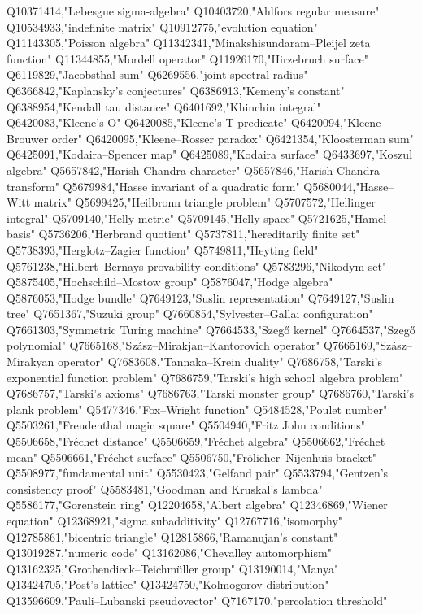 Q10371414,"Lebesgue sigma-algebra"
Q10403720,"Ahlfors regular measure"
Q10534933,"indefinite matrix"
Q10912775,"evolution equation"
Q11143305,"Poisson algebra"
Q11342341,"Minakshisundaram–Pleijel zeta function"
Q11344855,"Mordell operator"
Q11926170,"Hirzebruch surface"
Q6119829,"Jacobsthal sum"
Q6269556,"joint spectral radius"
Q6366842,"Kaplansky's conjectures"
Q6386913,"Kemeny's constant"
Q6388954,"Kendall tau distance"
Q6401692,"Khinchin integral"
Q6420083,"Kleene's O"
Q6420085,"Kleene's T predicate"
Q6420094,"Kleene–Brouwer order"
Q6420095,"Kleene–Rosser paradox"
Q6421354,"Kloosterman sum"
Q6425091,"Kodaira–Spencer map"
Q6425089,"Kodaira surface"
Q6433697,"Koszul algebra"
Q5657842,"Harish-Chandra character"
Q5657846,"Harish-Chandra transform"
Q5679984,"Hasse invariant of a quadratic form"
Q5680044,"Hasse–Witt matrix"
Q5699425,"Heilbronn triangle problem"
Q5707572,"Hellinger integral"
Q5709140,"Helly metric"
Q5709145,"Helly space"
Q5721625,"Hamel basis"
Q5736206,"Herbrand quotient"
Q5737811,"hereditarily finite set"
Q5738393,"Herglotz–Zagier function"
Q5749811,"Heyting field"
Q5761238,"Hilbert–Bernays provability conditions"
Q5783296,"Nikodym set"
Q5875405,"Hochschild–Mostow group"
Q5876047,"Hodge algebra"
Q5876053,"Hodge bundle"
Q7649123,"Suslin representation"
Q7649127,"Suslin tree"
Q7651367,"Suzuki group"
Q7660854,"Sylvester–Gallai configuration"
Q7661303,"Symmetric Turing machine"
Q7664533,"Szegő kernel"
Q7664537,"Szegő polynomial"
Q7665168,"Szász–Mirakjan–Kantorovich operator"
Q7665169,"Szász–Mirakyan operator"
Q7683608,"Tannaka–Krein duality"
Q7686758,"Tarski's exponential function problem"
Q7686759,"Tarski's high school algebra problem"
Q7686757,"Tarski's axioms"
Q7686763,"Tarski monster group"
Q7686760,"Tarski's plank problem"
Q5477346,"Fox–Wright function"
Q5484528,"Poulet number"
Q5503261,"Freudenthal magic square"
Q5504940,"Fritz John conditions"
Q5506658,"Fréchet distance"
Q5506659,"Fréchet algebra"
Q5506662,"Fréchet mean"
Q5506661,"Fréchet surface"
Q5506750,"Frölicher–Nijenhuis bracket"
Q5508977,"fundamental unit"
Q5530423,"Gelfand pair"
Q5533794,"Gentzen's consistency proof"
Q5583481,"Goodman and Kruskal's lambda"
Q5586177,"Gorenstein ring"
Q12204658,"Albert algebra"
Q12346869,"Wiener equation"
Q12368921,"sigma subadditivity"
Q12767716,"isomorphy"
Q12785861,"bicentric triangle"
Q12815866,"Ramanujan's constant"
Q13019287,"numeric code"
Q13162086,"Chevalley automorphism"
Q13162325,"Grothendieck–Teichmüller group"
Q13190014,"Manya"
Q13424705,"Post's lattice"
Q13424750,"Kolmogorov distribution"
Q13596609,"Pauli–Lubanski pseudovector"
Q7167170,"percolation threshold"
